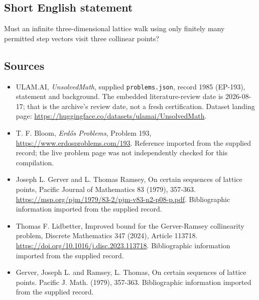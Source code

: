 \documentclass[11pt,a4paper]{article}
\begin{document}
\subsection{Short English statement}

Must an infinite three-dimensional lattice walk using only finitely many permitted step vectors visit three collinear points?

\subsection{Sources}

{\small

\begin{itemize}

\item[\hypertarget{source:1985:1}{S1}] ULAM.AI, \emph{UnsolvedMath}, supplied \texttt{problems.json}, record 1985 (EP-193), statement and background. The embedded literature-review date is 2026-08-17; that is the archive’s review date, not a fresh certification. Dataset landing page: \url{https://huggingface.co/datasets/ulamai/UnsolvedMath}.

\item[\hypertarget{source:1985:2}{S2}] T. F. Bloom, \emph{Erdős Problems}, Problem 193, \url{https://www.erdosproblems.com/193}. Reference imported from the supplied record; the live problem page was not independently checked for this compilation.

\item[\hypertarget{source:1985:3}{S3}] Joseph L. Gerver and L. Thomas Ramsey, On certain sequences of lattice points, Pacific Journal of Mathematics 83 (1979), 357-363. \url{https://msp.org/pjm/1979/83-2/pjm-v83-n2-p08-p.pdf}. Bibliographic information imported from the supplied record.

\item[\hypertarget{source:1985:4}{S4}] Thomas F. Lidbetter, Improved bound for the Gerver-Ramsey collinearity problem, Discrete Mathematics 347 (2024), Article 113718. \url{https://doi.org/10.1016/j.disc.2023.113718}. Bibliographic information imported from the supplied record.

\item[\hypertarget{source:1985:5}{S5}] Gerver, Joseph L. and Ramsey, L. Thomas, On certain sequences of lattice points. Pacific J. Math. (1979), 357-363. Bibliographic information imported from the supplied record.

\end{itemize}

}

\label{end:1985}
\end{document}
